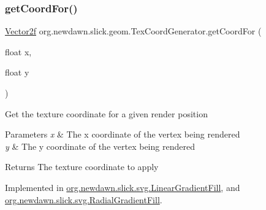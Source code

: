 \subsubsection{\texorpdfstring{get\+Coord\+For()}{getCoordFor()}}
{\footnotesize\ttfamily \mbox{\hyperlink{classorg_1_1newdawn_1_1slick_1_1geom_1_1_vector2f}{Vector2f}} org.\+newdawn.\+slick.\+geom.\+Tex\+Coord\+Generator.\+get\+Coord\+For (\begin{DoxyParamCaption}\item[{float}]{x,  }\item[{float}]{y }\end{DoxyParamCaption})}

Get the texture coordinate for a given render position


\begin{DoxyParams}{Parameters}
{\em x} & The x coordinate of the vertex being rendered \\
\hline
{\em y} & The y coordinate of the vertex being rendered \\
\hline
\end{DoxyParams}
\begin{DoxyReturn}{Returns}
The texture coordinate to apply 
\end{DoxyReturn}


Implemented in \mbox{\hyperlink{classorg_1_1newdawn_1_1slick_1_1svg_1_1_linear_gradient_fill_a2e7291eea3735f7070d9705dd1f43bb3}{org.\+newdawn.\+slick.\+svg.\+Linear\+Gradient\+Fill}}, and \mbox{\hyperlink{classorg_1_1newdawn_1_1slick_1_1svg_1_1_radial_gradient_fill_a5709cfc21a18fd1489d0d0a5efdf46bf}{org.\+newdawn.\+slick.\+svg.\+Radial\+Gradient\+Fill}}.


